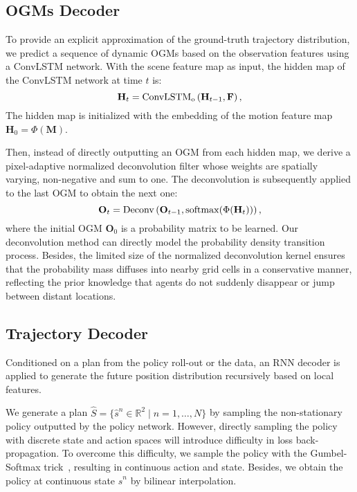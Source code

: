 \documentclass[10pt,twocolumn,letterpaper]{article}
\begin{document}
\subsection{OGMs Decoder}

To provide an explicit approximation of the ground-truth trajectory distribution, we predict a sequence of dynamic OGMs based on the observation features using a ConvLSTM network. With the scene feature map as input, the hidden map of the ConvLSTM network at time $t$ is:
\begin{equation}
\mathbf{H}_t=\operatorname{ConvLSTM_o} \left(\mathbf{H}_{t-1},\mathbf{F}\right), \notag
\end{equation}
The hidden map is initialized with the embedding of the motion feature map $\mathbf{H}_0=\Phi(\mathbf{M})$.

Then, instead of directly outputting an OGM from each hidden map, we derive a pixel-adaptive normalized deconvolution filter whose weights are spatially varying, non-negative and sum to one. The deconvolution is subsequently applied to the last OGM to obtain the next one:
\begin{equation}
\mathbf{O}_{t}=\operatorname{Deconv} \left(\mathbf{O}_{t-1},\operatorname{softmax}(\Phi(\mathbf{H}_t))  \right), \notag
\end{equation}
where the initial OGM $\mathbf{O}_{0}$ is a probability matrix to be learned. Our deconvolution method can directly model the probability density transition process. Besides, the limited size of the normalized deconvolution kernel ensures that the probability mass diffuses into nearby grid cells in a conservative manner, reflecting the prior knowledge that agents do not suddenly disappear or jump between distant locations.



\subsection{Trajectory Decoder}

Conditioned on a plan from the policy roll-out or the data, an RNN decoder is applied to generate the future position distribution recursively based on local features.


 We generate a plan $\hat{S}=\{\hat{s}^n \in \mathbb{R}^2 \mid n=1,\dots,N\}$ by sampling the non-stationary policy outputted by the policy network. However, directly sampling the policy with discrete state and action spaces will introduce difficulty in loss back-propagation. To overcome this difficulty, we sample the policy with the Gumbel-Softmax trick~\cite{jang2017categorical}, resulting in continuous action and state. Besides, we obtain the policy at continuous state $\hat{s}^n$ by bilinear interpolation.
\end{document}
